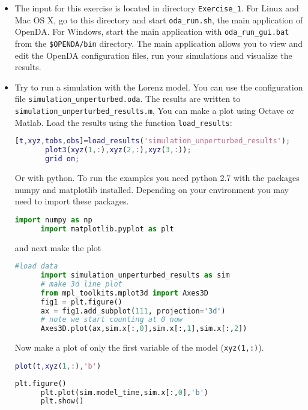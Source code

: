 \documentclass[a4paper,10pt]{article}
\begin{document}
\begin{itemize}
\item The input for this exercise is located in directory {\tt Exercise\_1}.
      For Linux and Mac OS X, go to this directory and start {\tt oda\_run.sh}, the
      main application of OpenDA. For Windows, start the main application with 
      {\tt oda\_run\_gui.bat} from the {\tt \$OPENDA/bin} directory. The main 
      application allows you to view and edit the OpenDA configuration files, run your
      simulations and visualize the results.
\item Try to run a simulation with the Lorenz model. You can use the
      configuration file {\tt simulation\_unperturbed.oda}. The results are
      written to {\tt simulation\_unperturbed\_results.m}, You can make a
      plot using Octave or Matlab. Load the results using the function
      {\tt load\_results}:
      \begin{lstlisting}[language=Matlab,frame=single,caption={Matlab}]
       [t,xyz,tobs,obs]=load_results('simulation_unperturbed_results');
       plot3(xyz(1,:),xyz(2,:),xyz(3,:));
       grid on;
      \end{lstlisting}
      Or with python. To run the examples you need python 2.7 with the packages numpy and matplotlib installed. Depending
      on your environment you may need to import these packages.
      \begin{lstlisting}[language=Python,frame=single,caption={Python initialize}]
      import numpy as np
      import matplotlib.pyplot as plt
      \end{lstlisting}
      and next make the plot
      \begin{lstlisting}[language=Python,frame=single,caption={Python}]
      #load data
      import simulation_unperturbed_results as sim
      # make 3d line plot
      from mpl_toolkits.mplot3d import Axes3D
      fig1 = plt.figure()
      ax = fig1.add_subplot(111, projection='3d')
      # note we start counting at 0 now
      Axes3D.plot(ax,sim.x[:,0],sim.x[:,1],sim.x[:,2])
      \end{lstlisting}
      
      Now make a plot of only the first variable of the model ({\tt xyz(1,:)}).
      \begin{lstlisting}[language=Matlab,frame=single,caption={Matlab}]
      plot(t,xyz(1,:),'b')
      \end{lstlisting}
      \begin{lstlisting}[language=Python,frame=single,caption={Python}]
      plt.figure()
      plt.plot(sim.model_time,sim.x[:,0],'b')
      plt.show()
      \end{lstlisting}
%


\end{itemize}
\end{document}
